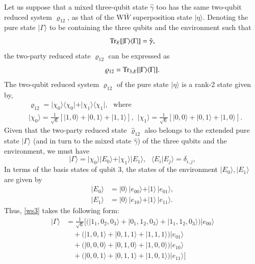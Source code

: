 {Let us suppose that a mixed  three-qubit state $\hat\gamma$ too has the same two-qubit reduced system $\varrho_{12}$, as that of the W$\bar W$ superposition state $\vert \eta\rangle.$ Denoting the pure state $\vert \Gamma\rangle$ to be containing the three qubits and the environment such that  
\[ 
{\rm Tr}_{E}[\vert\Gamma\rangle\langle \Gamma\vert]=\hat\gamma,
\] 
the two-party reduced state $\varrho_{12}$ can be expressed as 
$$
\varrho_{12}={\rm Tr}_{3, E}[\vert \Gamma\rangle\langle \Gamma\vert].
$$ 
The two-qubit reduced system $\varrho_{12}$ of the pure state $\vert\eta\rangle$ is a rank-2 state given by,  
\begin{align*}
& \varrho_{12}=\vert \chi_0\rangle\langle \chi_0\vert + 
\vert \chi_1\rangle\langle \chi_1\vert, \ \ \ \mbox{where}\label{ws2}\\ 
& \vert \chi_0\rangle=\frac{1}{\sqrt{6}}[|1,0\rangle+|0,1\rangle+|1,1\rangle], \ \ \vert \chi_1\rangle=\frac{1}{\sqrt{6}}[|0,0\rangle+|0,1\rangle+|1,0\rangle].  \nonumber
\end{align*}
Given that the two-party reduced state $\hat{\varrho}_{12}$ also belongs to the extended pure state $\vert\Gamma\rangle$ (and in turn to the mixed state $\hat\gamma$) of the three qubits and the environment, we must have  
\begin{equation}
\vert\Gamma\rangle=\vert \chi_0\rangle\vert E_0\rangle +\vert \chi_1\rangle\vert E_1\rangle, \ \ \ \langle E_i\vert E_j\rangle=\delta_{i,j},\label{ws3}
 \end{equation}     
In terms of the basis states of qubit 3, the states of the environment $\vert E_{0}\rangle, \vert E_{1}\rangle$ are given by
\begin{align*}
\vert E_0\rangle&=\vert 0\rangle\,  \vert e_{00}\rangle+\vert 1\rangle\,  \vert e_{01}\rangle, \nonumber\\ 
\vert E_1\rangle&=\vert 0\rangle\,  \vert e_{10}\rangle+\vert 1\rangle\,  \vert e_{11}\rangle.
\end{align*}   
Thus, \eqref{ws3} takes the following form: 
\begin{align} 
|\Gamma\rangle&=\frac{1}{\sqrt{6}}[(|1_1,0_2,0_3\rangle+|0_1,1_2,0_3\rangle+|1_1,1_2,0_3\rangle)|e_{00}\rangle\nonumber\\
&\quad +(|1,0,1\rangle+|0,1,1\rangle+|1,1,1\rangle)|e_{01}\rangle \nonumber \\
&\quad + (|0,0,0\rangle+|0,1,0\rangle+|1,0,0\rangle)|e_{10}\rangle\nonumber\\
&\quad +(|0,0,1\rangle +|0,1,1\rangle+|1,0,1\rangle)|e_{11}\rangle] \label{Gamma}

\end{align}}
